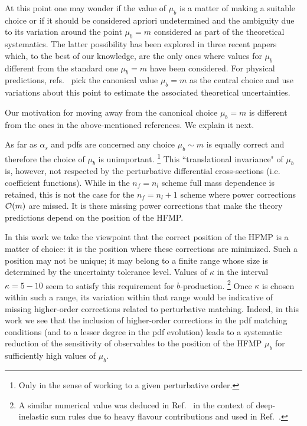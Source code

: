 \documentclass[letter,11pt]{article}
\def\as{\alpha_s}
\def\nf{{n_f}}
\def\nl{{n_l}}
\def\mub{\mu_b}
\begin{document}
At this point one may wonder if the value of $\mub$ is a matter of making a suitable choice or if it should be considered apriori undetermined and the ambiguity due to its variation around the point $\mub=m$ considered as part of the theoretical systematics. 
%
The latter possibility has been explored in three recent papers \cite{Bonvini:2015pxa,Bonvini:2016fgf,Bertone:2017ehk} which, to the best of our knowledge, are the only ones where values for $\mub$ different from the standard one $\mub=m$ have been considered. For physical predictions, refs.~\cite{Bonvini:2015pxa,Bonvini:2016fgf} pick the canonical value $\mub = m$ as the central choice and use variations about this point to estimate the associated theoretical uncertainties.

Our motivation for moving away from the canonical choice $\mub=m$ is different from the ones in the above-mentioned references. We explain it next.

As far as $\as$ and pdfs are concerned any choice $\mub\sim m$ is equally correct and therefore the choice of $\mub$ is unimportant.
%
\footnote{Only in the sense of working to a given perturbative order.}
%
This ``translational invariance" of $\mub$ is, however, not respected by the perturbative differential cross-sections (i.e. coefficient functions). While in the $\nf=\nl$ scheme full mass dependence is retained, this is not the case for the $\nf=\nl+1$ scheme where power corrections ${\cal O}(m)$ are missed. It is these missing power corrections that make the theory predictions depend on the position of the HFMP.

In this work we take the viewpoint that the correct position of the HFMP is a matter of choice: it is the position where these corrections are minimized. Such a position may not be unique; it may belong to a finite range whose size is determined by the uncertainty tolerance level. Values of $\kappa$ in the interval $\kappa=5-10$ seem to satisfy this requirement for $b$-production.
%
\footnote{A similar numerical value was deduced in Ref.~\cite{Blumlein:1998sh} in the context of deep-inelastic sum rules due to heavy flavour contributions and used in Ref.~\cite{Kataev:2001kk}.}
%
Once $\kappa$ is chosen within such a range, its variation within that range would be indicative of missing higher-order corrections related to perturbative matching. Indeed, in this work we see that the inclusion of higher-order corrections in the pdf matching conditions (and to a lesser degree in the pdf evolution) leads to a systematic reduction of the sensitivity of observables to the position of the HFMP $\mub$ for sufficiently high values of $\mub$.
\end{document}
